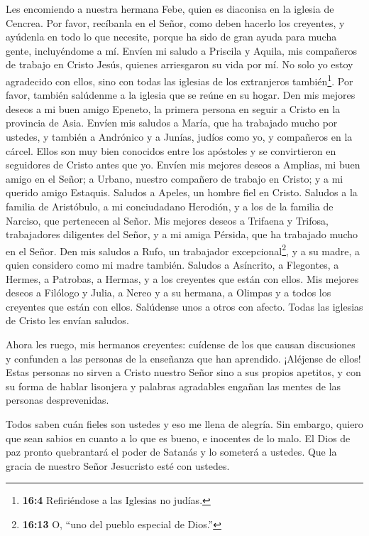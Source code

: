  Les encomiendo a nuestra hermana Febe, quien es diaconisa
en la iglesia de Cencrea.  Por favor, recíbanla en el Señor,
como deben hacerlo los creyentes, y ayúdenla en todo lo que necesite,
porque ha sido de gran ayuda para mucha gente, incluyéndome a mí.
 Envíen mi saludo a Priscila y Aquila, mis compañeros de
trabajo en Cristo Jesús,  quienes arriesgaron su vida por
mí. No solo yo estoy agradecido con ellos, sino con todas las iglesias
de los extranjeros también\footnote{\textbf{16:4} Refiriéndose a las
  Iglesias no judías.}.  Por favor, también salúdenme a la
iglesia que se reúne en su hogar. Den mis mejores deseos a mi buen amigo
Epeneto, la primera persona en seguir a Cristo en la provincia de Asia.
 Envíen mis saludos a María, que ha trabajado mucho por
ustedes,  y también a Andrónico y a Junías, judíos como yo,
y compañeros en la cárcel. Ellos son muy bien conocidos entre los
apóstoles y se convirtieron en seguidores de Cristo antes que yo.
 Envíen mis mejores deseos a Amplias, mi buen amigo en el
Señor;  a Urbano, nuestro compañero de trabajo en Cristo; y
a mi querido amigo Estaquis.  Saludos a Apeles, un hombre
fiel en Cristo. Saludos a la familia de Aristóbulo,  a mi
conciudadano Herodión, y a los de la familia de Narciso, que pertenecen
al Señor.  Mis mejores deseos a Trifaena y Trifosa,
trabajadores diligentes del Señor, y a mi amiga Pérsida, que ha
trabajado mucho en el Señor.  Den mis saludos a Rufo, un
trabajador excepcional\footnote{\textbf{16:13} O, ``uno del pueblo
  especial de Dios.''}, y a su madre, a quien considero como mi madre
también.  Saludos a Asíncrito, a Flegontes, a Hermes, a
Patrobas, a Hermas, y a los creyentes que están con ellos. 
Mis mejores deseos a Filólogo y Julia, a Nereo y a su hermana, a Olimpas
y a todos los creyentes que están con ellos.  Salúdense
unos a otros con afecto. Todas las iglesias de Cristo les envían
saludos.

 Ahora les ruego, mis hermanos creyentes: cuídense de los
que causan discusiones y confunden a las personas de la enseñanza que
han aprendido. ¡Aléjense de ellos!  Estas personas no
sirven a Cristo nuestro Señor sino a sus propios apetitos, y con su
forma de hablar lisonjera y palabras agradables engañan las mentes de
las personas desprevenidas.

 Todos saben cuán fieles son ustedes y eso me llena de
alegría. Sin embargo, quiero que sean sabios en cuanto a lo que es
bueno, e inocentes de lo malo.  El Dios de paz pronto
quebrantará el poder de Satanás y lo someterá a ustedes. Que la gracia
de nuestro Señor Jesucristo esté con ustedes.

